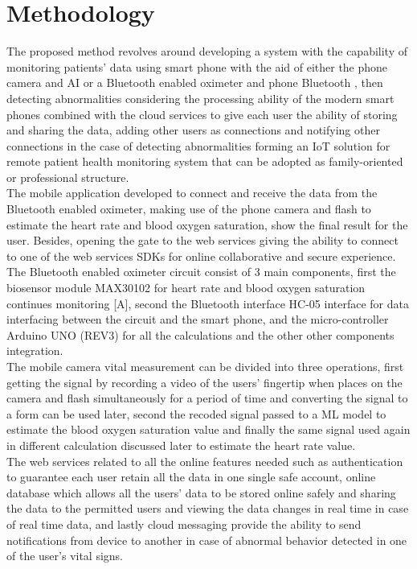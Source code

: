 \documentclass{bmcart}
\begin{document}
\section*{Methodology}
The proposed method revolves around developing a system with the capability of
monitoring patients’ data using smart phone with the aid of either the phone
camera and AI or a Bluetooth enabled oximeter and phone Bluetooth , then
detecting abnormalities considering the processing ability of the modern smart
phones combined with the cloud services to give each user the ability of storing
and sharing the data, adding other users as connections and notifying other
connections in the case of detecting abnormalities forming an IoT solution for
remote patient health monitoring system that can be adopted as family-oriented
or professional structure.\\
The mobile application developed to connect and receive the data from the
Bluetooth enabled oximeter, making use of the phone camera and flash to estimate
the heart rate and blood oxygen saturation, show the final result for the user.
Besides, opening the gate to the web services giving the ability to connect to
one of the web services SDKs for online collaborative and secure experience.\\
The Bluetooth enabled oximeter circuit consist of 3 main components, first the
biosensor module MAX30102 for heart rate and blood oxygen saturation continues
monitoring [A], second the Bluetooth interface HC-05 interface for data
interfacing between the circuit and the smart phone, and the micro-controller
Arduino UNO (REV3) for all the calculations and the other other components
integration.\\
The mobile camera vital measurement can be divided into three operations, first
getting the signal by recording a video of the users’ fingertip when places on
the camera and flash simultaneously for a period of time and converting the
signal to a form can be used later, second the recoded signal passed to a ML
model to estimate the blood oxygen saturation value and finally the same signal
used again in different calculation discussed later to estimate the heart rate
value.\\
The web services related to all the online features needed such as
authentication to  guarantee each user retain all the data in one single safe
account, online database which allows all the users’ data to be stored online
safely and sharing the data to the permitted users and viewing the data changes
in real time in case of real time data, and  lastly cloud messaging provide the
ability to send notifications from device to another in case of abnormal
behavior detected in one of the user’s vital signs.\\
\end{document}
